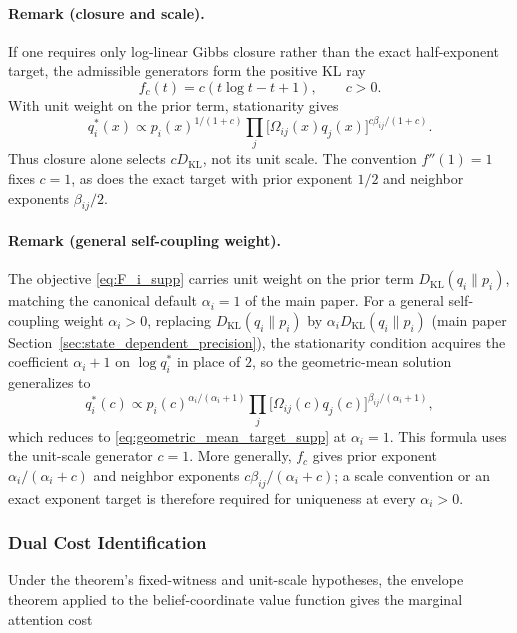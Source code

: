 \documentclass[twoside,11pt]{article}
\begin{document}
\paragraph{Remark (closure and scale).}
If one requires only log-linear Gibbs closure rather than the exact half-exponent target, the admissible generators form the positive KL ray
\begin{equation}
f_c(t)=c(t\log t-t+1), \qquad c>0.
\end{equation}
With unit weight on the prior term, stationarity gives
\begin{equation}
q_i^*(x)\propto p_i(x)^{1/(1+c)}
\prod_j\bigl[\Omega_{ij}(x)q_j(x)\bigr]^{c\beta_{ij}/(1+c)}.
\end{equation}
Thus closure alone selects $cD_{\mathrm{KL}}$, not its unit scale. The convention $f''(1)=1$ fixes $c=1$, as does the exact target with prior exponent $1/2$ and neighbor exponents $\beta_{ij}/2$.

\paragraph{Remark (general self-coupling weight).} The objective \eqref{eq:F_i_supp} carries unit weight on the prior term $D_{\mathrm{KL}}(q_i \| p_i)$, matching the canonical default $\alpha_i = 1$ of the main paper. For a general self-coupling weight $\alpha_i > 0$, replacing $D_{\mathrm{KL}}(q_i \| p_i)$ by $\alpha_i D_{\mathrm{KL}}(q_i \| p_i)$ (main paper Section~\ref{sec:state_dependent_precision}), the stationarity condition acquires the coefficient $\alpha_i + 1$ on $\log q_i^*$ in place of $2$, so the geometric-mean solution generalizes to
\begin{equation}
q_i^*(c) \propto p_i(c)^{\alpha_i/(\alpha_i + 1)} \prod_{j}\bigl[\Omega_{ij}(c) q_j(c)\bigr]^{\beta_{ij}/(\alpha_i + 1)},
\end{equation}
which reduces to \eqref{eq:geometric_mean_target_supp} at $\alpha_i = 1$. This formula uses the unit-scale generator $c=1$. More generally, $f_c$ gives prior exponent $\alpha_i/(\alpha_i+c)$ and neighbor exponents $c\beta_{ij}/(\alpha_i+c)$; a scale convention or an exact exponent target is therefore required for uniqueness at every $\alpha_i>0$.

\subsubsection{Dual Cost Identification}
Under the theorem's fixed-witness and unit-scale hypotheses, the envelope theorem applied to the belief-coordinate value function gives the marginal attention cost
\end{document}
